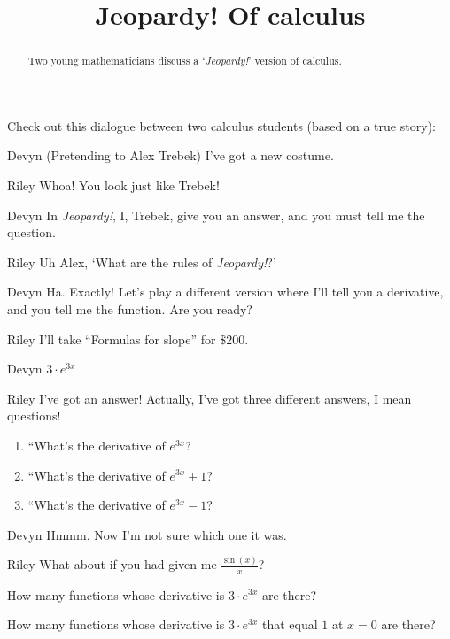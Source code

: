 \documentclass{ximera}
\title[Break-Ground:]{Jeopardy! Of calculus}
\begin{document}
\begin{abstract}
  Two young mathematicians discuss a `\textit{Jeopardy!}' version of calculus.
\end{abstract}
\maketitle

Check out this dialogue between two calculus students (based on a true story):

\begin{dialogue}
\item[Devyn] (Pretending to Alex Trebek) I've got a new costume.
\item[Riley] Whoa! You look just like Trebek!
\item[Devyn] In \textit{Jeopardy!}, I, Trebek, give you an answer, and you must tell me the question.
\item[Riley] Uh Alex, `What are the rules of \textit{Jeopardy!}?'
\item[Devyn] Ha. Exactly! Let's play a different version where I'll
  tell you a derivative, and you tell me the function.  Are you ready?
\item[Riley] I'll take ``Formulas for slope'' for $\$200$.
\item[Devyn] $3\cdot e^{3x}$  
\item[Riley] I've got an answer!  Actually, I've got three different
  answers, I mean questions!
  \begin{enumerate}
  \item ``What's the derivative of $e^{3x}$?
  \item ``What's the derivative of $e^{3x}+1$?
  \item ``What's the derivative of $e^{3x}-1$?
  \end{enumerate}
\item[Devyn] Hmmm. Now I'm not sure which one it was.
\item[Riley] What about if you had given me $\frac{\sin(x)}{x}$?
\end{dialogue}


\begin{problem}
  How many functions whose derivative is $3\cdot e^{3x}$ are there?
  \begin{multipleChoice}
  \end{multipleChoice}
\end{problem}

\begin{problem}
  How many functions whose derivative is $3\cdot e^{3x}$ that equal
  $1$ at $x=0$ are there?
  \begin{multipleChoice}
  \end{multipleChoice}
\end{problem}


\end{document}

